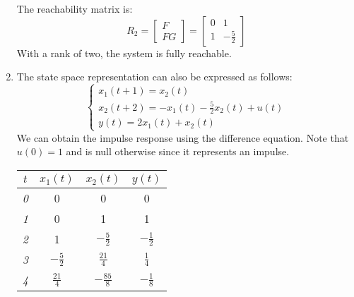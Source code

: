 \begin{enumerate}
        The reachability matrix is:
        \[R_2=\begin{bmatrix} F \\ FG \end{bmatrix}=\begin{bmatrix} 0 & 1 \\ 1 & -\frac{5}{2} \end{bmatrix}\]
        With a rank of two, the system is fully reachable.
    \item The state space representation can also be expressed as follows:
        \[\begin{cases}
            x_1(t+1)=x_2(t) \\
            x_2(t+2)=-x_1(t)-\frac{5}{2}x_2(t)+u(t) \\
            y(t)=2x_1(t)+x_2(t)
        \end{cases}\]
        We can obtain the impulse response using the difference equation. 
        Note that $u(0)=1$ and is null otherwise since it represents an impulse.
        \begin{table}[H]
            \centering
            \begin{tabular}{|c|c|c|c|}
            \hline
            \textit{$t$} & \textit{$x_1(t)$} & \textit{$x_2(t)$} & \textit{$y(t)$} \\ \hline
            \textit{0}   & 0                 & 0                 & 0               \\ \hline
            \textit{1}   & 0                 & 1                 & 1               \\ \hline
            \textit{2}   & 1                 & $-\frac{5}{2}$    & $-\frac{1}{2}$  \\ \hline
            \textit{3}   & $-\frac{5}{2}$    & $\frac{21}{4}$    & $\frac{1}{4}$   \\ \hline
            \textit{4}   & $\frac{21}{4}$    & $-\frac{85}{8}$   & $-\frac{1}{8}$  \\ \hline
            \end{tabular}
        \end{table}


\end{enumerate}
